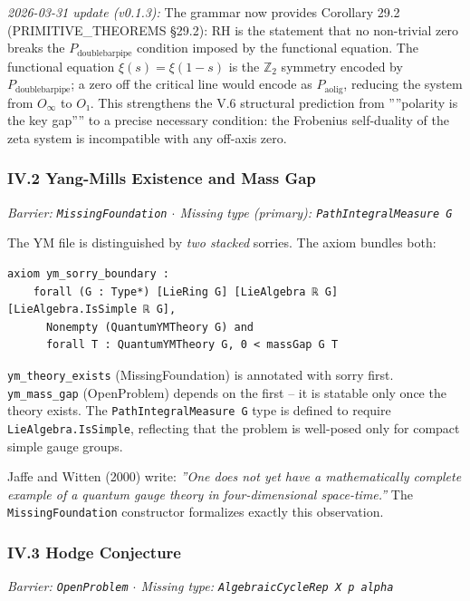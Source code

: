 \documentclass[12pt,a4paper]{article}
\newcommand{\pilcrow}{\S}
\begin{document}
\emph{2026-03-31 update (v0.1.3):} The grammar now provides Corollary 29.2 (PRIMITIVE\_THEOREMS \pilcrow{}29.2): RH is the statement that no non-trivial zero breaks the $P_{\text{doublebarpipe}}$ condition imposed by the functional equation. The functional equation $\xi(s) = \xi(1-s)$ is the $\mathbb{Z}_2$ symmetry encoded by $P_{\text{doublebarpipe}}$; a zero off the critical line would encode as $P_{\text{aolig}}$, reducing the system from $O_{\infty}$ to $O₁$. This strengthens the V.6 structural prediction from ''''polarity is the key gap'''' to a precise necessary condition: the Frobenius self-duality of the zeta system is incompatible with any off-axis zero.

\subsubsection{IV.2 Yang-Mills Existence and Mass Gap}

\emph{Barrier: \texttt{MissingFoundation} $\cdot$ Missing type (primary): \texttt{PathIntegralMeasure G}}

The YM file is distinguished by \emph{two stacked} sorries. The axiom bundles both:

\begin{lstlisting}[language=lean]
axiom ym_sorry_boundary :
    forall (G : Type*) [LieRing G] [LieAlgebra ℝ G] [LieAlgebra.IsSimple ℝ G],
      Nonempty (QuantumYMTheory G) and
      forall T : QuantumYMTheory G, 0 < massGap G T
\end{lstlisting}

\texttt{ym\_theory\_exists} (MissingFoundation) is annotated with sorry first. \texttt{ym\_mass\_gap} (OpenProblem) depends on the first  --  it is statable only once the theory exists. The \texttt{PathIntegralMeasure G} type is defined to require \texttt{LieAlgebra.IsSimple}, reflecting that the problem is well-posed only for compact simple gauge groups.

Jaffe and Witten (2000) write: \emph{''One does not yet have a mathematically complete example of a quantum gauge theory in four-dimensional space-time.''} The \texttt{MissingFoundation} constructor formalizes exactly this observation.

\subsubsection{IV.3 Hodge Conjecture}

\emph{Barrier: \texttt{OpenProblem} $\cdot$ Missing type: \texttt{AlgebraicCycleRep X p alpha}}
\end{document}
